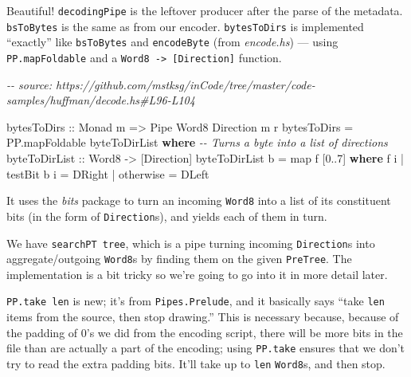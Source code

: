 \documentclass[]{article}
\newenvironment{Shaded}{}{}
\newcommand{\CommentTok}[1]{\textcolor[rgb]{0.38,0.63,0.69}{\textit{#1}}}
\newcommand{\DataTypeTok}[1]{\textcolor[rgb]{0.56,0.13,0.00}{#1}}
\newcommand{\DecValTok}[1]{\textcolor[rgb]{0.25,0.63,0.44}{#1}}
\newcommand{\FunctionTok}[1]{\textcolor[rgb]{0.02,0.16,0.49}{#1}}
\newcommand{\KeywordTok}[1]{\textcolor[rgb]{0.00,0.44,0.13}{\textbf{#1}}}
\newcommand{\NormalTok}[1]{#1}
\newcommand{\OperatorTok}[1]{\textcolor[rgb]{0.40,0.40,0.40}{#1}}
\newcommand{\OtherTok}[1]{\textcolor[rgb]{0.00,0.44,0.13}{#1}}
\begin{document}
Beautiful! \texttt{decodingPipe} is the leftover producer after the parse of the
metadata. \texttt{bsToBytes} is the same as from our encoder.
\texttt{bytesToDirs} is implemented ``exactly'' like \texttt{bsToBytes} and
\texttt{encodeByte} (from \emph{encode.hs}) --- using \texttt{PP.mapFoldable}
and a \texttt{Word8\ -\textgreater{}\ {[}Direction{]}} function.

\begin{Shaded}
\begin{Highlighting}[]
\CommentTok{{-}{-} source: https://github.com/mstksg/inCode/tree/master/code{-}samples/huffman/decode.hs\#L96{-}L104}

\OtherTok{bytesToDirs ::} \DataTypeTok{Monad}\NormalTok{ m }\OtherTok{=\textgreater{}} \DataTypeTok{Pipe} \DataTypeTok{Word8} \DataTypeTok{Direction}\NormalTok{ m r}
\NormalTok{bytesToDirs }\OtherTok{=}\NormalTok{ PP.mapFoldable byteToDirList}
  \KeywordTok{where}
    \CommentTok{{-}{-} Turns a byte into a list of directions}
\OtherTok{    byteToDirList ::} \DataTypeTok{Word8} \OtherTok{{-}\textgreater{}}\NormalTok{ [}\DataTypeTok{Direction}\NormalTok{]}
\NormalTok{    byteToDirList b }\OtherTok{=} \FunctionTok{map}\NormalTok{ f [}\DecValTok{0}\OperatorTok{..}\DecValTok{7}\NormalTok{]}
      \KeywordTok{where}
\NormalTok{        f i }\OperatorTok{|}\NormalTok{ testBit b i }\OtherTok{=} \DataTypeTok{DRight}
            \OperatorTok{|} \FunctionTok{otherwise}   \OtherTok{=} \DataTypeTok{DLeft}
\end{Highlighting}
\end{Shaded}

It uses the \emph{bits} package to turn an incoming \texttt{Word8} into a list
of its constituent bits (in the form of \texttt{Direction}s), and yields each of
them in turn.

We have \texttt{searchPT\ tree}, which is a pipe turning incoming
\texttt{Direction}s into aggregate/outgoing \texttt{Word8}s by finding them on
the given \texttt{PreTree}. The implementation is a bit tricky so we're going to
go into it in more detail later.

\texttt{PP.take\ len} is new; it's from \texttt{Pipes.Prelude}, and it basically
says ``take \texttt{len} items from the source, then stop drawing.'' This is
necessary because, because of the padding of 0's we did from the encoding
script, there will be more bits in the file than are actually a part of the
encoding; using \texttt{PP.take} ensures that we don't try to read the extra
padding bits. It'll take up to \texttt{len} \texttt{Word8}s, and then stop.
\end{document}
